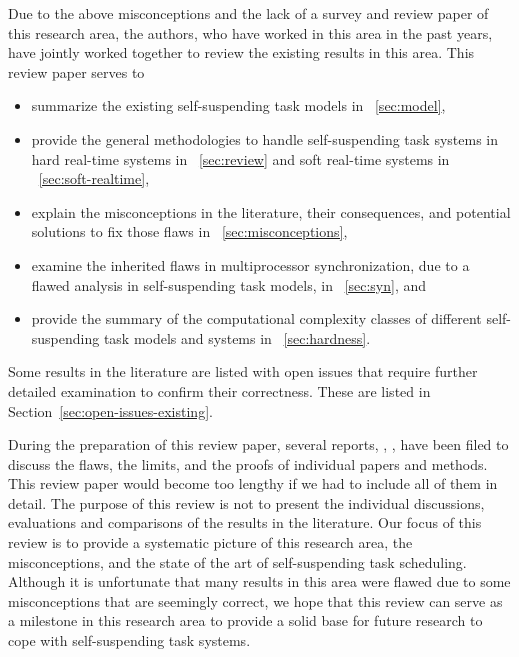 \noindent Due to the above misconceptions and the lack of a survey and review paper of this research area, the authors, who have worked in this area in the past years, have jointly worked together to review the existing results in this area. This review paper serves to
\begin{itemize}
\item summarize the existing self-suspending task models in \mysectionref{}~\ref{sec:model}, 
\item provide the general methodologies to handle self-suspending task systems in hard real-time systems in \mysectionref{}~\ref{sec:review} and soft real-time systems in \mysectionref{}~\ref{sec:soft-realtime}, 
\item explain the misconceptions in the literature, their consequences, and potential solutions to fix those flaws in \mysectionref{}~\ref{sec:misconceptions}, 
\item examine the inherited flaws in multiprocessor synchronization, due to a flawed analysis in self-suspending task models, in \mysectionref{}~\ref{sec:syn}, and
\item provide the summary of the computational complexity classes of different self-suspending task models and systems in \mysectionref{}~\ref{sec:hardness}.
\end{itemize}
Some results in the literature are listed with open issues that require further detailed examination to confirm their correctness. These are listed in Section~\ref{sec:open-issues-existing}. 

During the preparation of this review paper, several reports, \ie, \cite{ChenHuangNelissen,ChenBrandenburg,erratu-cong-anderson,BletsasReport2015}, have been filed to discuss the flaws, the limits, and the proofs of individual papers and methods. This review paper would become too lengthy if we had to include all of them in detail.  The purpose of this review is not to present the individual discussions, evaluations and comparisons of the results in the literature. Our focus of this review is to provide a systematic picture of this research area, the misconceptions, and the state of the art of self-suspending task scheduling. Although it is unfortunate that many results in this area were flawed due to some misconceptions that are seemingly correct, we hope that this review can serve as a milestone in this research area to provide a solid base for future research to cope with self-suspending task systems.









    
  

    
  
